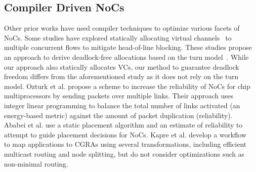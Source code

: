 \subsection{Compiler Driven NoCs}
Other prior works have used compiler techniques to optimize various facets of NoCs.
Some studies have explored statically allocating virtual channels~\cite{staticVC-isca, staticVC-nocs} to multiple concurrent flows to mitigate head-of-line blocking. These studies propose an approach to derive deadlock-free allocations based on the turn model~\cite{turnModel}. While our approach also statically allocates VCs, our method to guarantee deadlock freedom differs from the aforementioned study as it does not rely on the turn model.
Ozturk et al. \cite{ozturk2010compiler} propose a scheme to increase the reliability of NoCs for chip multiprocessors by sending packets over multiple links.
Their approach uses integer linear programming to balance the total number of links activated (an energy-based metric) against the amount of packet duplication (reliability).
Ababei et al. \cite{ababei2011energy} use a static placement algorithm and an estimate of reliability to attempt to guide placement decisions for NoCs.
Kapre et al. \cite{kapre2011noc} develop a workflow to map applications to CGRAs using several transformations, including efficient multicast routing and node splitting, but do not consider optimizations such as non-minimal routing.

